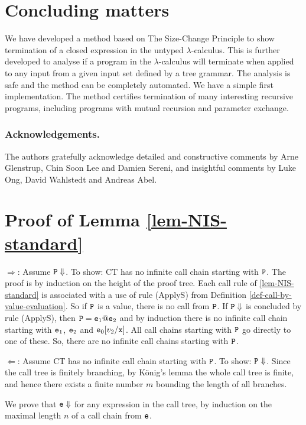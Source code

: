 \documentclass{LMCS}
\newcommand{\bprf}{\proof}
\theoremstyle{definition}\newtheorem{env}[thm]{Environment}
\begin{document}
\section{Concluding matters}

We have developed a method based on The Size-Change Principle to show termination of a closed expression in the untyped $\lambda$-calculus. This is further developed to analyse if a program in the $\lambda$-calculus will terminate when applied to any input from a given input set defined by a tree grammar. The analysis is safe and the method can be  completely automated. We have a simple first implementation. The method certifies termination of many interesting recursive programs, including programs with mutual recursion and parameter exchange.

\subsubsection*{Acknowledgements.} The authors gratefully acknowledge 
detailed and constructive comments by Arne Glenstrup, Chin Soon 
Lee and Damien Sereni, and insightful comments by Luke Ong, David Wahlstedt and Andreas Abel.
\appendix


\section{Proof of Lemma \ref{lem-NIS-standard}}

\bprf 
$\Rightarrow$: Assume ${\tt P}\Downarrow$. To show: CT has no infinite call chain starting with ${\tt P}$. 
The proof is by induction on the height of the proof tree. Each call rule of  \ref{lem-NIS-standard} is associated 
with a use of rule (ApplyS) from Definition 
\ref{def-call-by-value-evaluation}. So if ${\tt P}$ is a value, there is no call from ${\tt P}$. If ${\tt P}\Downarrow$ is concluded by rule (ApplyS), then ${\tt P}={\tt e}_1{\tt@e}_2$ and  by induction there is no infinite call chain starting with ${\tt e}_1$, ${\tt e}_2$ and ${\tt e}_0[v_2/{\tt x}]$. All call chains starting with ${\tt P}$ go  directly to one of these. So, there are no infinite call chains starting with ${\tt P}$.


 $\Leftarrow$: Assume CT has no infinite call chain starting with ${\tt P}$. To show: ${\tt P}\Downarrow$.  
Since the call tree is finitely branching,
 by K\"{o}nig's lemma the whole call tree is finite, and 
 hence there exists a finite number $m$ bounding the length of all branches.

We prove  that  ${\tt e} \Downarrow$ for any expression in the call tree, by induction on the maximal length $n$ of a call chain from 
${\tt e}$. 
\end{document}
